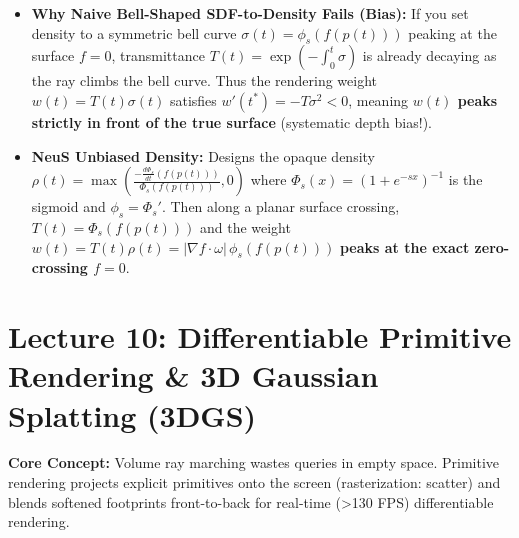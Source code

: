 \documentclass[11pt,a4paper]{article}
\theoremstyle{definition}
\theoremstyle{plain}
\theoremstyle{remark}
\begin{document}
\begin{itemize}
\begin{itemize}
        \item \textbf{Why Naive Bell-Shaped SDF-to-Density Fails (Bias):} If you set density to a symmetric bell curve $\sigma(t) = \phi_s(f(p(t)))$ peaking at the surface $f=0$, transmittance $T(t) = \exp(-\int_0^t \sigma)$ is already decaying as the ray climbs the bell curve. Thus the rendering weight $w(t) = T(t)\sigma(t)$ satisfies $w'(t^*) = -T\sigma^2 < 0$, meaning \textbf{$w(t)$ peaks strictly in front of the true surface} (systematic depth bias!).
        \item \textbf{NeuS Unbiased Density:} Designs the opaque density $\rho(t) = \max\!\left(\frac{-\frac{d\Phi_s}{dt}(f(p(t)))}{\Phi_s(f(p(t)))}, 0\right)$ where $\Phi_s(x) = (1+e^{-sx})^{-1}$ is the sigmoid and $\phi_s = \Phi_s'$. Then along a planar surface crossing, $T(t) = \Phi_s(f(p(t)))$ and the weight $w(t) = T(t)\rho(t) = |\nabla f\cdot\omega|\,\phi_s(f(p(t)))$ \textbf{peaks at the exact zero-crossing $f=0$}.
    \end{itemize}
\end{itemize}

\hr
\section*{\textcolor{primary}{Lecture 10: Differentiable Primitive Rendering \& 3D Gaussian Splatting (3DGS)}}
\textbf{Core Concept:} Volume ray marching wastes queries in empty space. Primitive rendering projects explicit primitives onto the screen (rasterization: scatter) and blends softened footprints front-to-back for real-time (>130 FPS) differentiable rendering.
\end{document}
